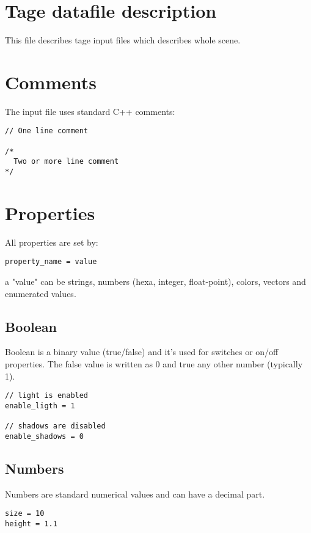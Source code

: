 \documentclass[9pt]{article}
\begin{document}
\section{Tage datafile description}

This file describes tage input files which describes whole scene.

\section{Comments}

The input file uses standard C++ comments:

\begin{verbatim}
// One line comment

/*
  Two or more line comment
*/
\end{verbatim}

\section{Properties}

All properties are set by:

\begin{verbatim}
property_name = value
\end{verbatim}

a "value" can be strings, numbers (hexa, integer, float-point), colors, vectors
and enumerated values.

\subsection{Boolean}

Boolean is a binary value (true/false) and it's used for switches
or on/off properties. The false value is written as 0 and true any other
number (typically 1).

\begin{verbatim}
// light is enabled 
enable_ligth = 1

// shadows are disabled
enable_shadows = 0
\end{verbatim}

\subsection{Numbers}

Numbers are standard numerical values and can have a decimal part.

\begin{verbatim}
size = 10
height = 1.1
\end{verbatim}
\end{document}
